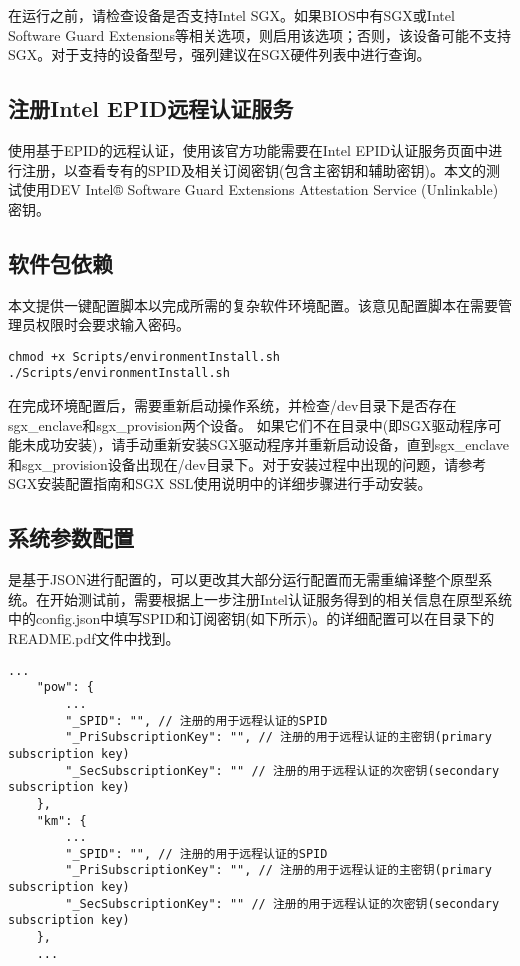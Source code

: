 在运行\prototype 之前，请检查设备是否支持Intel SGX。如果BIOS中有SGX或Intel Software Guard Extensions等相关选项，则启用该选项；否则，该设备可能不支持SGX。对于支持的设备型号，强列建议在SGX硬件列表中进行查询。

\subsection*{注册Intel EPID远程认证服务}

\prototype 使用基于EPID的远程认证，使用该官方功能需要在Intel EPID认证服务页面中进行注册，以查看专有的SPID及相关订阅密钥(包含主密钥和辅助密钥)。本文的测试使用DEV Intel® Software Guard Extensions Attestation Service (Unlinkable)密钥。

\subsection*{软件包依赖}
本文提供一键配置脚本以完成\prototype 所需的复杂软件环境配置。该意见配置脚本在需要管理员权限时会要求输入密码。

\begin{lstlisting}[style=shell]
chmod +x Scripts/environmentInstall.sh
./Scripts/environmentInstall.sh
\end{lstlisting}

在完成环境配置后，需要重新启动操作系统，并检查/dev目录下是否存在sgx\_enclave和sgx\_provision两个设备。 如果它们不在目录中(即SGX驱动程序可能未成功安装)，请手动重新安装SGX驱动程序并重新启动设备，直到sgx\_enclave和sgx\_provision设备出现在/dev目录下。对于安装过程中出现的问题，请参考SGX安装配置指南和SGX SSL使用说明中的详细步骤进行手动安装。

\subsection*{系统参数配置}

\prototype 是基于JSON进行配置的，可以更改其大部分运行配置而无需重编译整个原型系统。在开始测试前，需要根据上一步注册Intel认证服务得到的相关信息在原型系统中的config.json中填写SPID和订阅密钥(如下所示)。\prototype 的详细配置可以在\prototype 目录下的README.pdf文件中找到。

\begin{lstlisting}[style=json]
    ...
    "pow": {
        ...
        "_SPID": "", // 注册的用于远程认证的SPID
        "_PriSubscriptionKey": "", // 注册的用于远程认证的主密钥(primary subscription key)
        "_SecSubscriptionKey": "" // 注册的用于远程认证的次密钥(secondary subscription key)
    },
    "km": {
        ...
        "_SPID": "", // 注册的用于远程认证的SPID
        "_PriSubscriptionKey": "", // 注册的用于远程认证的主密钥(primary subscription key)
        "_SecSubscriptionKey": "" // 注册的用于远程认证的次密钥(secondary subscription key)
    },
    ...
\end{lstlisting}

